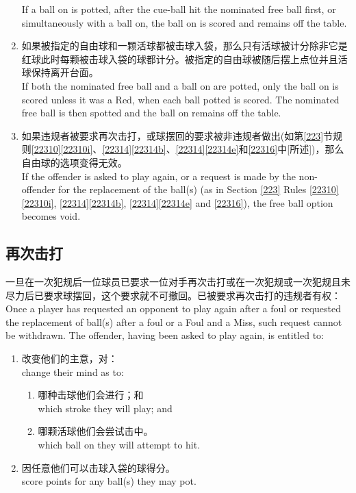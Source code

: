 \begin{enumerate}[label=(\alph*)]
    If a ball on is potted, after the cue-ball hit the nominated free ball first, or simultaneously with a ball on, the ball on is scored and remains off the table.
    \item 如果被指定的自由球和一颗活球都被击球入袋，那么只有活球被计分除非它是红球此时每颗被击球入袋的球都计分。被指定的自由球被随后摆上点位并且活球保持离开台面。\\
    If both the nominated free ball and a ball on are potted, only the ball on is scored unless it was a Red, when each ball potted is scored. The nominated free ball is then spotted and the ball on remains off the table.
    \item 如果违规者被要求再次击打，或球摆回的要求被非违规者做出(如第\ref{223}节规则\ref{22310}\ref{22310i}、\ref{22314}\ref{22314b}、\ref{22314}\ref{22314e}和\ref{22316}中[所述])，那么自由球的选项变得无效。\\
    If the offender is asked to play again, or a request is made by the non-offender for the replacement of the ball(s) (as in Section \ref{223} Rules \ref{22310}\ref{22310i}, \ref{22314}\ref{22314b}, \ref{22314}\ref{22314e} and \ref{22316}), the free ball option becomes void.
\end{enumerate}

\subsection{再次击打}

\noindent 一旦在一次犯规后一位球员已要求一位对手再次击打或在一次犯规或一次犯规且未尽力后已要求球摆回，这个要求就不可撤回。已被要求再次击打的违规者有权：\\
Once a player has requested an opponent to play again after a foul or requested the replacement of ball(s) after a foul or a Foul and a Miss, such request cannot be withdrawn. The offender, having been asked to play again, is entitled to:
\begin{enumerate}[label=(\alph*)]
    \item 改变他们的主意，对：\\
    change their mind as to:
    \begin{enumerate}[label=(\roman*)]
        \item 哪种击球他们会进行；和\\
        which stroke they will play; and
        \item 哪颗活球他们会尝试击中。\\
        which ball on they will attempt to hit.
    \end{enumerate}
    \item 因任意他们可以击球入袋的球得分。\\
    score points for any ball(s) they may pot.
\end{enumerate}


